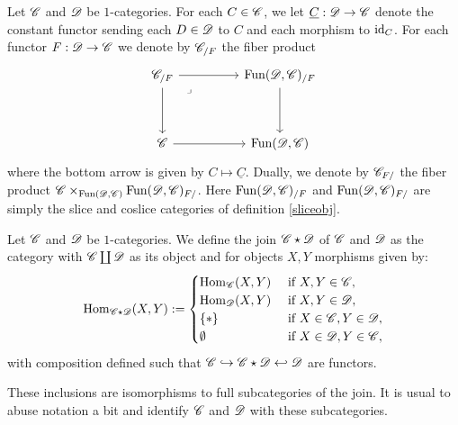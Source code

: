 \documentclass[../../thesis.tex]{subfiles}
\begin{document}
\begin{definition}\label{slicefun}
    Let $\mathscr{C}$ and $\mathscr{D}$ be $1$-categories.
    For each $C\in \mathscr{C}$, we let $\underline{C} : \mathscr{D} \to \mathscr{C}$ denote the constant functor sending each $D\in \mathscr{D}$ to $C$ and each morphism to $\operatorname{id}_C$.
    For each functor $F:\mathscr{D}\to\mathscr{C}$ we denote by $\mathscr{C}_{/F}$ the fiber product
    \[\begin{tikzcd}
            {\C_{/F}} && {\Fun(\D,\C)_{/F}} \\
            \\
            \C && {\Fun(\D,\C)}
            \arrow[from=1-1, to=1-3]
            \arrow[from=1-1, to=3-1]
            \arrow[from=3-1, to=3-3]
            \arrow[from=1-3, to=3-3]
            \arrow["\lrcorner"{anchor=center, pos=0.125}, draw=none, from=1-1, to=3-3]
        \end{tikzcd}\]
    where the bottom arrow is given by $C \mapsto \underline{C}$.
    Dually, we denote by $\mathscr{C}_{F/}$ the fiber product ${\mathscr{C} \times_{\mathrm{Fun}(\mathscr{D},\mathscr{C})}\mathrm{Fun}(\mathscr{D},\mathscr{C})_{F/}}$.
    Here $\mathrm{Fun}(\mathscr{D},\mathscr{C})_{/F}$ and $\mathrm{Fun}(\mathscr{D},\mathscr{C})_{F/}$ are simply the slice and coslice categories of definition \ref{sliceobj}.
\end{definition}
\begin{definition}
    Let $\mathscr{C}$ and $\mathscr{D}$ be $1$-categories.
    We define the join $\mathscr{C} \star \mathscr{D}$ of $\mathscr{C}$ and $\mathscr{D}$ as the category with $\mathscr{C} \coprod \mathscr{D}$ as its object and for objects $X, Y$ morphisms given by:
    \[
        \mathrm{Hom}_{\mathscr{C} \star \mathscr{D}}(X,Y) : =
        \begin{cases}
            \mathrm{Hom}_{\mathscr{C}}(X,Y) & \text{ if } X,Y \in \mathscr{C},         \\
            \mathrm{Hom}_{\mathscr{D}}(X,Y) & \text{ if } X,Y \in \mathscr{D},         \\
            \{*\}          & \text{ if } X \in \mathscr{C}, Y \in \mathscr{D}, \\
            \emptyset      & \text{ if } X \in \mathscr{D}, Y\in \mathscr{C},
        \end{cases}
    \]
    with composition defined such that $\mathscr{C} \hookrightarrow \mathscr{C} \star \mathscr{D} \hookleftarrow \mathscr{D}$ are functors.
\end{definition}
\begin{remark}
    These inclusions are isomorphisms to full subcategories of the join.
    It is usual to abuse notation a bit and identify $\mathscr{C}$ and $\mathscr{D}$ with these subcategories.
\end{remark}
\begin{remark}
\end{remark}
\end{document}
